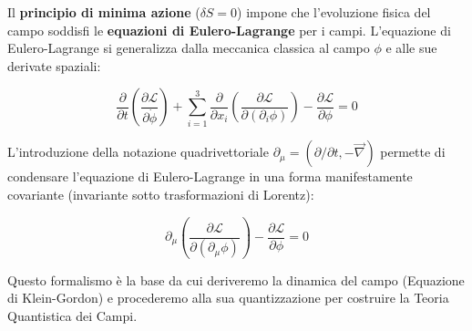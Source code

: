 Il \textbf{principio di minima azione} ($\delta S = 0$) impone che l'evoluzione fisica del campo soddisfi le \textbf{equazioni di Eulero-Lagrange} per i campi. L'equazione di Eulero-Lagrange si generalizza dalla meccanica classica al campo $\phi$ e alle sue derivate spaziali:

\begin{equation}
\frac{\partial}{\partial t} \left( \frac{\partial \mathcal{L}}{\partial \dot{\phi}} \right) + \sum_{i=1}^{3} \frac{\partial}{\partial x_i} \left( \frac{\partial \mathcal{L}}{\partial (\partial_i \phi)} \right) - \frac{\partial \mathcal{L}}{\partial \phi} = 0
\end{equation}

L'introduzione della notazione quadrivettoriale $\partial_\mu = (\partial/\partial t, -\vec{\nabla})$ permette di condensare l'equazione di Eulero-Lagrange in una forma manifestamente covariante (invariante sotto trasformazioni di Lorentz):

\begin{equation}
\partial_\mu \left( \frac{\partial \mathcal{L}}{\partial (\partial_\mu \phi)} \right) - \frac{\partial \mathcal{L}}{\partial \phi} = 0
\end{equation}

Questo formalismo è la base da cui deriveremo la dinamica del campo (Equazione di Klein-Gordon) e procederemo alla sua quantizzazione per costruire la Teoria Quantistica dei Campi.
